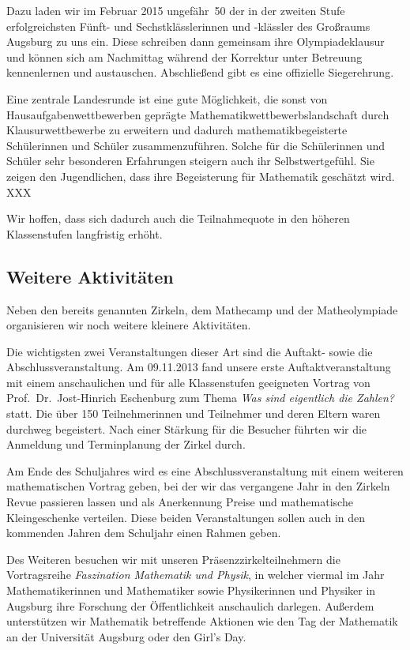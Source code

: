 \documentclass[12pt]{zettel}
\begin{document}
Dazu laden wir im Februar 2015 ungefähr~50 der in der zweiten Stufe
erfolgreichsten Fünft- und Sechstklässlerinnen und -klässler des Großraums
Augsburg zu uns ein. Diese schreiben dann gemeinsam ihre Olympiadeklausur und
können sich am Nachmittag während der Korrektur unter Betreuung kennenlernen
und austauschen. Abschließend gibt es eine offizielle Siegerehrung.

Eine zentrale Landesrunde ist eine gute Möglichkeit, die sonst von
Hausaufgabenwettbewerben geprägte Mathematikwettbewerbslandschaft durch
Klausurwettbewerbe zu erweitern und dadurch mathematikbegeisterte Schülerinnen
und Schüler zusammenzuführen. Solche für die Schülerinnen und Schüler
sehr besonderen Erfahrungen steigern auch ihr Selbstwertgefühl. Sie zeigen
den Jugendlichen, dass ihre Begeisterung für Mathematik geschätzt wird. XXX

Wir hoffen, dass sich dadurch auch die Teilnahmequote
in den höheren Klassenstufen langfristig erhöht.


\subsection{Weitere Aktivitäten}

Neben den bereits genannten Zirkeln, dem Mathecamp und der
Matheolympiade organisieren wir noch weitere kleinere
Aktivitäten.

Die wichtigsten zwei Veranstaltungen dieser Art sind die Auftakt- sowie die
Abschlussveranstaltung. Am 09.11.2013 fand unsere erste
Auftaktveranstaltung mit einem anschaulichen und für alle Klassenstufen
geeigneten Vortrag von
Prof.~Dr.~Jost-Hinrich Eschenburg zum Thema \emph{Was sind eigentlich die
Zahlen?} statt.
Die über 150 Teilnehmerinnen und Teilnehmer und deren Eltern waren durchweg
begeistert. Nach einer Stärkung für die Besucher führten wir
die Anmeldung und Terminplanung der Zirkel durch.

Am Ende des Schuljahres wird es eine Abschlussveranstaltung mit einem
weiteren mathematischen Vortrag geben, bei der wir
das vergangene Jahr in den Zirkeln Revue passieren lassen und als Anerkennung
Preise und mathematische Kleingeschenke verteilen. Diese beiden Veranstaltungen sollen
auch in den kommenden Jahren dem Schuljahr einen Rahmen geben.

Des Weiteren besuchen wir mit unseren Präsenzzirkelteilnehmern die
Vortragsreihe \emph{Faszination Mathematik und Physik}, in welcher viermal im
Jahr Mathematikerinnen und Mathematiker sowie Physikerinnen und Physiker in Augsburg ihre Forschung der
Öffentlichkeit anschaulich darlegen. Außerdem unterstützen wir
Mathematik betreffende Aktionen wie den Tag der Mathematik an
der Universität Augsburg oder den Girl's Day.
\end{document}
